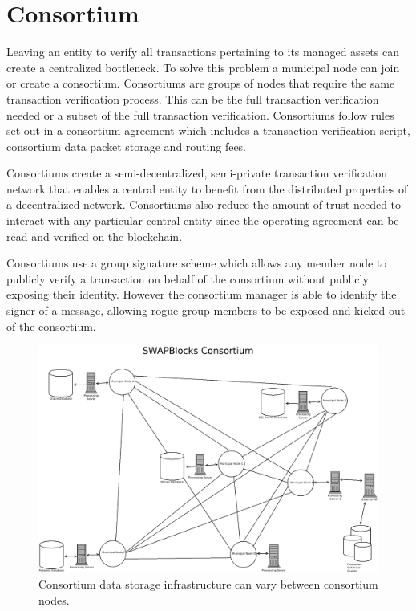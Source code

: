 \documentclass[12pt]{article}
\begin{document}
\section{Consortium}

Leaving an entity to verify all transactions pertaining to its managed assets can create 
a centralized bottleneck.  To solve this problem a municipal node can join or create a consortium.  
Consortiums are groups of nodes that require the same transaction verification process.  
This can be the full transaction verification needed or a subset of the full transaction verification. 
Consortiums follow rules set out in a consortium agreement which includes a transaction 
verification script, consortium data packet storage and routing fees.

Consortiums create a semi-decentralized, semi-private transaction verification network that 
enables a central entity to benefit from the distributed properties of a decentralized network.  
Consortiums also reduce the amount of trust needed to interact with any particular central 
entity since the operating agreement can be read and verified on the blockchain.

Consortiums use a group signature scheme which allows any member node to publicly verify a transaction on
behalf of the consortium
without publicly
exposing their identity.  However the consortium manager is able to identify the signer
of a message, allowing rogue group members to be exposed and kicked out of the consortium.



\begin{figure}[h]
	\centering
	\includegraphics[width=.85\textwidth]{consortium}
	\caption{Consortium data storage infrastructure can vary between consortium nodes.} 
	\label{fig:consortium}
\end{figure}
\end{document}
